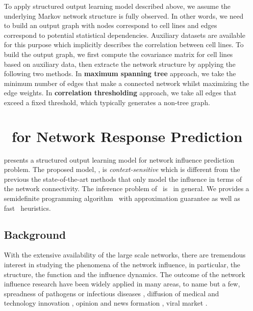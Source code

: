 {%
To apply structured output learning model described above, we assume the underlying Markov network structure is fully observed.
In other words, we need to build an output graph with nodes correspond to cell lines and edges correspond to potential statistical dependencies.
Auxiliary datasets are available for this purpose \citep{Shoemaker06the} which implicitly describes the correlation between cell lines.
To build the output graph, we first compute the covariance matrix for cell lines based on auxiliary data, then extracte the network structure by applying the following two methods.
In \textbf{maximum spanning tree} approach, we take the minimum number of edges that make a connected network whilst maximizing the edge weights.
In \textbf{correlation thresholding} approach, we take all edges that exceed a fixed threshold, which typically generates a non-tree graph.


%
%
\section{\spin\ for Network Response Prediction} \label{sc_su14b}

 presents a structured output learning model for network influence prediction problem.
The proposed model, \spin, is \textit{context-sensitive} which is different from the previous the state-of-the-art methods that only model the influence in terms of the network connectivity.
The inference problem of \spin\ is \nphard\ in general.
We provides a semidefinite programming algorithm \sdp\ with approximation guarantee as well as fast \greedy\ heuristics.

\subsection{Background}

With the extensive availability of the large scale networks, there are tremendous interest in studying the phenomena of the network influence, in particular, the structure, the function and the influence dynamics. 
The outcome of the network influence research have been widely applied in many areas, to name but a few, spreadness of pathogens or infectious diseases \citep{Hethcote00the,Anderson02infectious}, diffusion of medical and technology innovation \citep{Strang98diffusion,Rogers03the}, opinion and news formation \citep{Adar04implicit,Gruhl04information,Adar05tracking,Leskovec07cascading,Nowell08tracing,Leskovec09meme}, viral market \citep{Domingos01mining,Kempe03maximizing,Liben-Nowell03the}.

}
